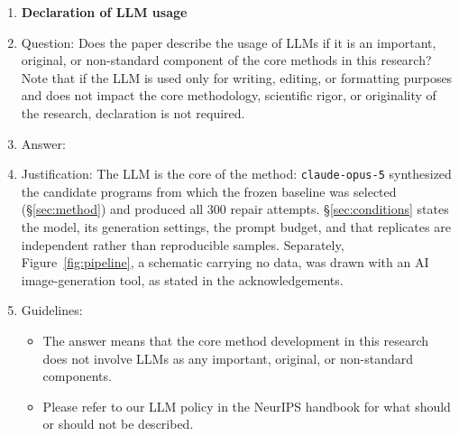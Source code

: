 \begin{enumerate}
\item {\bf Declaration of LLM usage}
    \item[] Question: Does the paper describe the usage of LLMs if it is an important, original, or non-standard component of the core methods in this research? Note that if the LLM is used only for writing, editing, or formatting purposes and does not impact the core methodology, scientific rigor, or originality of the research, declaration is not required.
    \item[] Answer: \answerYes{}
    \item[] Justification: The LLM is the core of the method: \texttt{claude-opus-5} synthesized the candidate programs from which the frozen baseline was selected (\S\ref{sec:method}) and produced all 300 repair attempts. \S\ref{sec:conditions} states the model, its generation settings, the prompt budget, and that replicates are independent rather than reproducible samples. Separately, Figure~\ref{fig:pipeline}, a schematic carrying no data, was drawn with an AI image-generation tool, as stated in the acknowledgements.
    \item[] Guidelines:
    \begin{itemize}
        \item The answer \answerNA{} means that the core method development in this research does not involve LLMs as any important, original, or non-standard components.
        \item Please refer to our LLM policy in the NeurIPS handbook for what should or should not be described.
    \end{itemize}

\end{enumerate}
